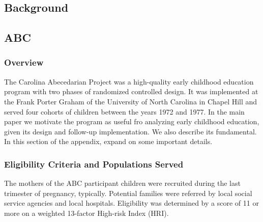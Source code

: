 \begin{appendices}
\setcounter{figure}{0}  \renewcommand{\thefigure}{A.\arabic{figure}}
\setcounter{table}{0}   \renewcommand{\thetable}{A.\arabic{table}}

\section{Background}

\subsection{ABC}

\subsubsection{Overview}

\noindent The Carolina Abecedarian Project was a high-quality early childhood education program with two phases of randomized controlled design. It was implemented at the Frank Porter Graham of the University of North Carolina in Chapel Hill and served four cohorts of children between the years 1972 and 1977. In the main paper we motivate the program as useful fro analyzing early childhood education, given its design and follow-up implementation. We also describe its fundamental. In this section of the appendix, expand on some important details.

\subsubsection{Eligibility Criteria and Populations Served}

\noindent The mothers of the ABC participant children were recruited during the last trimester  of pregnancy, typically. Potential families were referred by local social service agencies and local hospitals. Eligibility was determined by a score of 11 or more on a weighted 13-factor High-risk Index (HRI).\\ 


\end{appendices}
